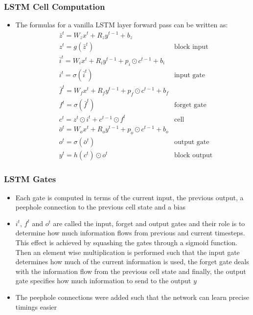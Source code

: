\documentclass{beamer}
\begin{document}
\begin{frame}
\frametitle{LSTM Cell Computation}
\begin{itemize}
	\item The formulas for a vanilla LSTM layer forward pass can be written as:
	\begin{align*}
		&\bar{z}^t = W_z x^t + R_z y^{t-1} + b_z& \\
		&z^t = g(\bar{z}^t)& \text{block input} \\
		&\bar{i}^t = W_i x^t + R_i y^{t-1} + p_i \odot c^{t-1} + b_i& \\
		&i^t = \sigma (\bar{i}^t)& \text{input gate} \\
		&\bar{f}^t = W_f x^t + R_f y^{t-1} + p_f \odot c^{t-1} + b_f& \\
		&f^t = \sigma (\bar{f}^t)& \text{forget gate} \\
		&c^t = z^t \odot i^t + c^{t-1} \odot f^t& \text{cell} \\
		&\bar{o}^t = W_o x^t + R_o y^{t-1} + p_o \odot c^{t-1} + b_o& \\
		&o^t = \sigma (\bar{o}^t)& \text{output gate} \\
		&y^t = h(c^t) \odot o^t& \text{block output}
	\end{align*}
\end{itemize}
\end{frame}

\begin{frame}
\frametitle{LSTM Gates}
\begin{itemize}
	\item Each gate is computed in terms of the current input, the previous output, a peephole connection to the previous cell state and a bias
	\item \(i^t\), \(f^t\) and \(o^t\) are called the input, forget and output gates and their role is to determine how much information flows from previous and current timesteps. This effect is achieved by squashing the gates through a sigmoid function. Then an element wise multiplication is performed such that the input gate determines how much of the current information is used, the forget gate deals with the information flow from the previous cell state and finally, the output gate specifies how much information to send to the output \(y\)
	\item The peephole connections were added such that the network can learn precise timings easier
\end{itemize}
\end{frame}
\end{document}
